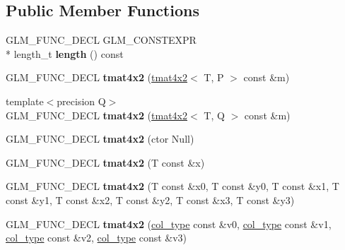 \subsection*{Public Member Functions}
\begin{DoxyCompactItemize}
\item 
\hypertarget{structglm_1_1detail_1_1tmat4x2_a25a9d035af6990fb0610cd1e37adc445}{G\-L\-M\-\_\-\-F\-U\-N\-C\-\_\-\-D\-E\-C\-L G\-L\-M\-\_\-\-C\-O\-N\-S\-T\-E\-X\-P\-R \\*
length\-\_\-t {\bfseries length} () const }\label{structglm_1_1detail_1_1tmat4x2_a25a9d035af6990fb0610cd1e37adc445}

\item 
\hypertarget{structglm_1_1detail_1_1tmat4x2_ab3c1fcf781e0219e317fde204095696a}{G\-L\-M\-\_\-\-F\-U\-N\-C\-\_\-\-D\-E\-C\-L {\bfseries tmat4x2} (\hyperlink{structglm_1_1detail_1_1tmat4x2}{tmat4x2}$<$ T, P $>$ const \&m)}\label{structglm_1_1detail_1_1tmat4x2_ab3c1fcf781e0219e317fde204095696a}

\item 
\hypertarget{structglm_1_1detail_1_1tmat4x2_ac81c7bdc54e869320b7fe713ef361f4c}{{\footnotesize template$<$precision Q$>$ }\\G\-L\-M\-\_\-\-F\-U\-N\-C\-\_\-\-D\-E\-C\-L {\bfseries tmat4x2} (\hyperlink{structglm_1_1detail_1_1tmat4x2}{tmat4x2}$<$ T, Q $>$ const \&m)}\label{structglm_1_1detail_1_1tmat4x2_ac81c7bdc54e869320b7fe713ef361f4c}

\item 
\hypertarget{structglm_1_1detail_1_1tmat4x2_a2abefa2846a92e5b1f5efc365a784791}{G\-L\-M\-\_\-\-F\-U\-N\-C\-\_\-\-D\-E\-C\-L {\bfseries tmat4x2} (ctor Null)}\label{structglm_1_1detail_1_1tmat4x2_a2abefa2846a92e5b1f5efc365a784791}

\item 
\hypertarget{structglm_1_1detail_1_1tmat4x2_a7e8cb6213554a2961c3725c89e3eb168}{G\-L\-M\-\_\-\-F\-U\-N\-C\-\_\-\-D\-E\-C\-L {\bfseries tmat4x2} (T const \&x)}\label{structglm_1_1detail_1_1tmat4x2_a7e8cb6213554a2961c3725c89e3eb168}

\item 
\hypertarget{structglm_1_1detail_1_1tmat4x2_af11c8214ce2df13c925feeae262c1916}{G\-L\-M\-\_\-\-F\-U\-N\-C\-\_\-\-D\-E\-C\-L {\bfseries tmat4x2} (T const \&x0, T const \&y0, T const \&x1, T const \&y1, T const \&x2, T const \&y2, T const \&x3, T const \&y3)}\label{structglm_1_1detail_1_1tmat4x2_af11c8214ce2df13c925feeae262c1916}

\item 
\hypertarget{structglm_1_1detail_1_1tmat4x2_a5e5749116ce86b6d1d0bd43d6c2158b0}{G\-L\-M\-\_\-\-F\-U\-N\-C\-\_\-\-D\-E\-C\-L {\bfseries tmat4x2} (\hyperlink{structglm_1_1detail_1_1tvec2}{col\-\_\-type} const \&v0, \hyperlink{structglm_1_1detail_1_1tvec2}{col\-\_\-type} const \&v1, \hyperlink{structglm_1_1detail_1_1tvec2}{col\-\_\-type} const \&v2, \hyperlink{structglm_1_1detail_1_1tvec2}{col\-\_\-type} const \&v3)}\label{structglm_1_1detail_1_1tmat4x2_a5e5749116ce86b6d1d0bd43d6c2158b0}


\end{DoxyCompactItemize}
